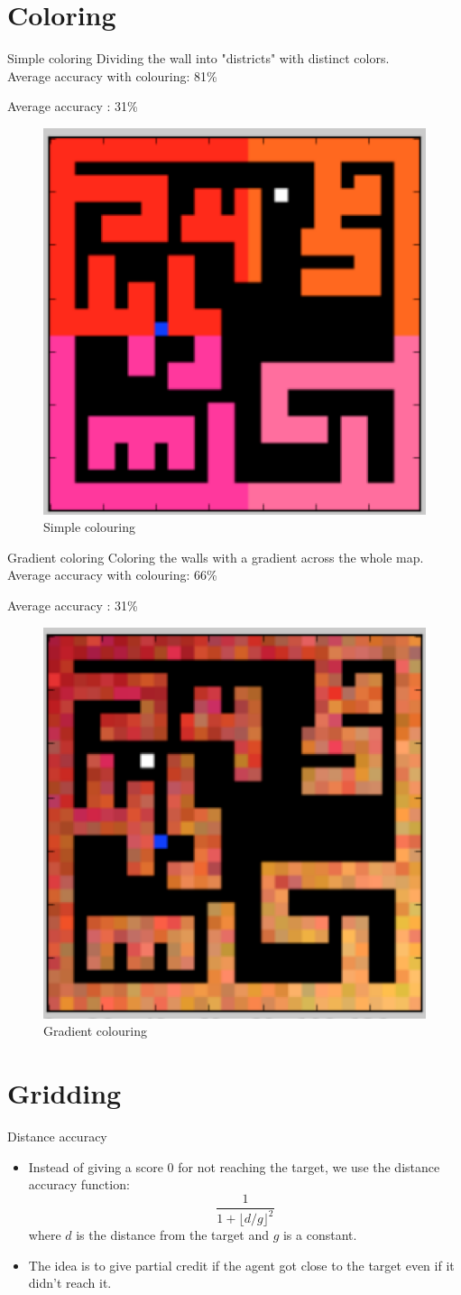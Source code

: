 \documentclass{beamer}
\begin{document}
\section{Coloring}
\begin{frame}{Simple coloring}
Dividing the wall into "districts" with distinct colors.\\
Average accuracy with colouring: 81\%

Average accuracy : 31\%
\begin{figure}
        \includegraphics[width=0.35\linewidth]{simple.png}
        \caption{Simple colouring}
    \label{fig1}
\end{figure}
\end{frame}

\begin{frame}{Gradient coloring}
Coloring the walls with a gradient across the whole map. \\
Average accuracy with colouring: 66\%

Average accuracy : 31\%
\begin{figure}
        \includegraphics[width=0.35\linewidth]{gradient.png}
        \caption{Gradient colouring}
    \label{fig2}
\end{figure}
\end{frame}

\section{Gridding}
\begin{frame}{Distance accuracy}
    \begin{itemize}
        \item Instead of giving a score 0 for not reaching the target, we use the distance accuracy function: $$\frac{1}{1 + {\lfloor d/g \rfloor}^2}$$ where $d$ is the distance from the target and $g$ is a constant.
        \item The idea is to give partial credit if the agent got close to the target even if it didn't reach it. 
    \end{itemize}
\end{frame}
\end{document}
